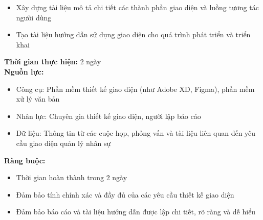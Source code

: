 {\begin{minipage}{\textwidth}
\begin{itemize}
        \item Xây dựng tài liệu mô tả chi tiết các thành phần giao diện và luồng tương tác người dùng
        \item Tạo tài liệu hướng dẫn sử dụng giao diện cho quá trình phát triển và triển khai
    \end{itemize}
    \noindent \textbf{Thời gian thực hiện:} 2 ngày \\
    \noindent \textbf{Nguồn lực:}
    \begin{itemize}
        \item Công cụ: Phần mềm thiết kế giao diện (như Adobe XD, Figma), phần mềm xử lý văn bản
        \item Nhân lực: Chuyên gia thiết kế giao diện, người lập báo cáo
        \item Dữ liệu: Thông tin từ các cuộc họp, phỏng vấn và tài liệu liên quan đến yêu cầu giao diện quản lý nhân sự
    \end{itemize}
    \noindent \textbf{Ràng buộc:}
    \begin{itemize}
        \item Thời gian hoàn thành trong 2 ngày
        \item Đảm bảo tính chính xác và đầy đủ của các yêu cầu thiết kế giao diện
        \item Đảm bảo báo cáo và tài liệu hướng dẫn được lập chi tiết, rõ ràng và dễ hiểu
    \end{itemize}
    \end{minipage}
}
\newpage
{}    
